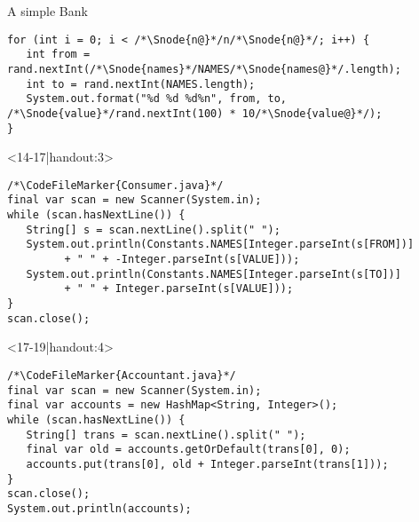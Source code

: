 \begin{frame}[fragile]{A simple Bank}
\begin{onlyenv}
\begin{layout-imageonly}
\begin{onlyenv}
\begin{verbatim}
for (int i = 0; i < /*\Snode{n@}*/n/*\Snode{n@}*/; i++) {
   int from = rand.nextInt(/*\Snode{names}*/NAMES/*\Snode{names@}*/.length);
   int to = rand.nextInt(NAMES.length);
   System.out.format("%d %d %d%n", from, to, /*\Snode{value}*/rand.nextInt(100) * 10/*\Snode{value@}*/);
}
\end{verbatim}
\end{onlyenv}
\begin{onlyenv}<14-17|handout:3>
\begin{verbatim}
/*\CodeFileMarker{Consumer.java}*/
final var scan = new Scanner(System.in);
while (scan.hasNextLine()) {
   String[] s = scan.nextLine().split(" ");
   System.out.println(Constants.NAMES[Integer.parseInt(s[FROM])]
         + " " + -Integer.parseInt(s[VALUE]));
   System.out.println(Constants.NAMES[Integer.parseInt(s[TO])]
         + " " + Integer.parseInt(s[VALUE]));
}
scan.close();
\end{verbatim}
\end{onlyenv}
\begin{onlyenv}<17-19|handout:4>
\begin{verbatim}
/*\CodeFileMarker{Accountant.java}*/
final var scan = new Scanner(System.in);
final var accounts = new HashMap<String, Integer>();
while (scan.hasNextLine()) {
   String[] trans = scan.nextLine().split(" ");
   final var old = accounts.getOrDefault(trans[0], 0);
   accounts.put(trans[0], old + Integer.parseInt(trans[1]));
}
scan.close();
System.out.println(accounts);
\end{verbatim}
\end{onlyenv}
\end{layout-imageonly}
\end{onlyenv}
\end{frame}

